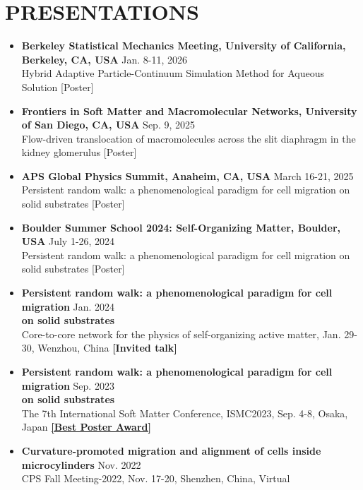 \documentclass[a4paper,10pt]{extarticle}
\begin{document}
\section*{PRESENTATIONS}
\begin{itemize}[leftmargin=*]
\item \textbf{Berkeley Statistical Mechanics Meeting, University of California, Berkeley, CA, USA }  \hfill Jan. 8-11, 2026 \\
Hybrid Adaptive Particle-Continuum Simulation Method for Aqueous Solution \hfill[Poster]\\

\item \textbf{Frontiers in Soft Matter and Macromolecular Networks, University of San Diego, CA, USA }  \hfill Sep. 9, 2025 \\
Flow-driven translocation of macromolecules across the slit diaphragm in the kidney glomerulus \hfill[Poster]\\

\item \textbf{APS Global Physics Summit, Anaheim, CA, USA }  \hfill March 16-21, 2025 \\
Persistent random walk: a phenomenological paradigm for cell migration on solid substrates \hfill[Poster]\\

\item \textbf{Boulder Summer School 2024: Self-Organizing Matter, Boulder, USA }  \hfill July 1-26, 2024 \\
Persistent random walk: a phenomenological paradigm for cell migration on solid substrates \hfill[Poster]\\

\item 
\textbf{Persistent random walk: a phenomenological paradigm for cell migration} \hfill Jan. 2024 \\ \textbf{on solid substrates}\\  
Core-to-core network for the physics of self-organizing active matter, Jan. 29-30, Wenzhou, China \hfill 
\textbf{[Invited talk]}\\
\item 
\textbf{Persistent random walk: a phenomenological paradigm for cell migration} \hfill Sep. 2023\\\textbf{on solid substrates}\\  
The 7th International Soft Matter Conference, ISMC2023, Sep. 4-8, Osaka, Japan \hfill 
\href{https://ismc2023.jp/awards.html}{\textbf{[Best Poster Award]}}\\
\item 
\textbf{Curvature-promoted migration and alignment of cells inside microcylinders}  \hfill Nov. 2022 \\
CPS Fall Meeting-2022, Nov. 17-20, Shenzhen, China, Virtual \\


\end{itemize}
\end{document}
